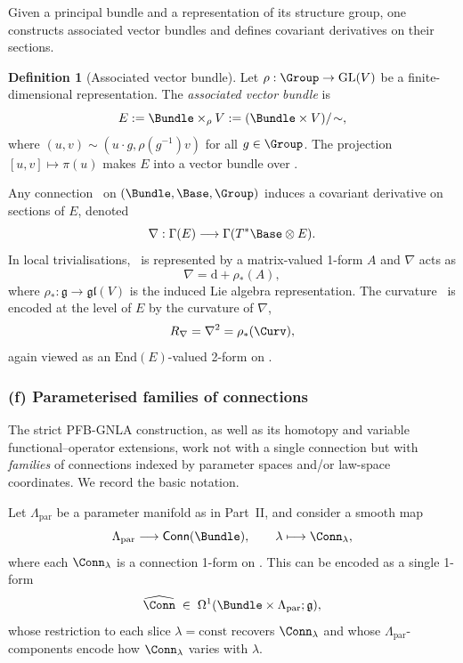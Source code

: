 \documentclass[11pt]{book}
\theoremstyle{plain}
\theoremstyle{definition}
\newtheorem{definition}[theorem]{Definition} \theoremstyle{remark}
\begin{document}
Given a principal bundle and a representation of its structure group,
one constructs associated vector bundles and defines covariant
derivatives on their sections.



\begin{definition}[Associated vector bundle]
Let $\rho:\Group\to\mathrm{GL}(V)$ be a finite-dimensional
  representation. The \emph{associated vector bundle} is
  \[
     E
     :=
     \Bundle\times_\rho V
     :=
     (\Bundle\times V)/\!\sim,
  \]
  where $(u,v)\sim(u\cdot g,\rho(g^{-1})v)$ for all $g\in\Group$. The
  projection $[u,v]\mapsto\pi(u)$ makes $E$ into a vector bundle over
  \Base.
\end{definition}

Any connection \Conn\ on $(\Bundle,\Base,\Group)$ induces a covariant
derivative on sections of $E$, denoted
\[
   \nabla:\Gamma(E)\longrightarrow\Gamma(T^*\Base\otimes E).
\]
In local trivialisations, \Conn\ is represented by a matrix-valued
1-form $A$ and $\nabla$ acts as
\[
   \nabla = \mathrm{d} + \rho_*(A),
\]
where $\rho_*:\mathfrak{g}\to\mathfrak{gl}(V)$ is the induced Lie
algebra representation. The curvature \Curv\ is encoded at the level
of $E$ by the curvature of $\nabla$,
\[
   R_\nabla = \nabla^2
            = \rho_*(\Curv),
\]
again viewed as an $\mathrm{End}(E)$-valued 2-form on \Base.



\subsubsection*{(f) Parameterised families of connections}

The strict PFB-GNLA construction, as well as its homotopy and variable
functional–operator extensions, work not with a single connection but
with \emph{families} of connections indexed by parameter spaces and/or
law-space coordinates. We record the basic notation.



Let $\Lambda_{\mathrm{par}}$ be a parameter manifold as in Part~II,
and consider a smooth map
\[
   \Lambda_{\mathrm{par}}
   \longrightarrow
   \mathsf{Conn}(\Bundle),
   \qquad
   \lambda\longmapsto\Conn_\lambda,
\]
where each $\Conn_\lambda$ is a connection 1-form on \Bundle. This can
be encoded as a single 1-form
\[
   \widehat{\Conn}
   \;\in\;
   \Omega^1(\Bundle\times\Lambda_{\mathrm{par}};\mathfrak{g}),
\]
whose restriction to each slice $\lambda=\mathrm{const}$ recovers
$\Conn_\lambda$ and whose $\Lambda_{\mathrm{par}}$-components encode
how $\Conn_\lambda$ varies with $\lambda$.
\end{document}
